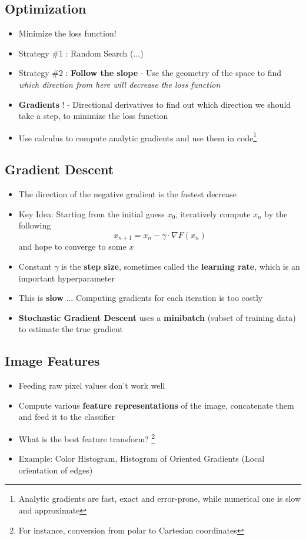 \subsection{Optimization}
\begin{itemize}
	\item Minimize the loss function!
	\item Strategy \#1 : Random Search (...)
	\item Strategy \#2 : \textbf{Follow the slope} - Use the geometry of the space to find \textit{which direction from here will decrease the loss function}
	\item \textbf{Gradients} ! - Directional derivatives to find out which direction we should take a step, to minimize the loss function
	\item Use calculus to compute analytic gradients and use them in code\footnote{Analytic gradients are fast, exact and error-prone, while numerical one is slow and approximate}
\end{itemize}

\subsection{Gradient Descent}
\begin{itemize}
	\item The direction of the negative gradient is the fastest decrease
	\item Key Idea: Starting from the initial guess $x_0$, iteratively compute $x_n$ by the following
	$$x_{n+1} = x_n - \gamma \cdot \nabla F(x_n)$$
	and hope to converge to some $x$
	\item Constant $\gamma$ is the \textbf{step size}, sometimes called the \textbf{learning rate}, which is an important hyperparameter
	\item This is \textbf{slow} ... Computing gradients for each iteration is too costly
	\item \textbf{Stochastic Gradient Descent} uses a \textbf{minibatch} (subset of training data) to estimate the true gradient
\end{itemize}

\subsection{Image Features}
\begin{itemize}
	\item Feeding raw pixel values don't work well
	\item Compute various \textbf{feature representations} of the image, concatenate them and feed it to the classifier
	\item What is the best feature transform? \footnote{For instance, conversion from polar to Cartesian coordinates}
	\item Example: Color Histogram, Histogram of Oriented Gradients (Local orientation of edges)
\end{itemize}
